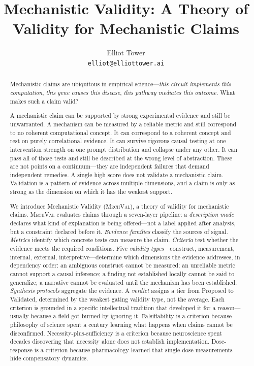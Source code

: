 \documentclass{article}
\title{Mechanistic Validity: A Theory of Validity for Mechanistic Claims}
\author{
Elliot Tower \\
\texttt{elliot@elliottower.ai}
}
\newcommand{\mechval}{\textsc{MechVal}}
\begin{document}
\maketitle

\begin{abstract}
Mechanistic claims are ubiquitous in empirical science---\emph{this circuit implements this computation}, \emph{this gene causes this disease}, \emph{this pathway mediates this outcome}. What makes such a claim valid?

A mechanistic claim can be supported by strong experimental evidence and still be unwarranted. A mechanism can be measured by a reliable metric and still correspond to no coherent computational concept. It can correspond to a coherent concept and rest on purely correlational evidence. It can survive rigorous causal testing at one intervention strength on one prompt distribution and collapse under any other. It can pass all of those tests and still be described at the wrong level of abstraction. These are not points on a continuum---they are independent failures that demand independent remedies. A single high score does not validate a mechanistic claim. Validation is a pattern of evidence across multiple dimensions, and a claim is only as strong as the dimension on which it has the weakest support.

We introduce Mechanistic Validity (\mechval{}), a theory of validity for mechanistic claims. \mechval{} evaluates claims through a seven-layer pipeline: a \emph{description mode} declares what kind of explanation is being offered---not a label applied after analysis, but a constraint declared before it. \emph{Evidence families} classify the sources of signal. \emph{Metrics} identify which concrete tests can measure the claim. \emph{Criteria} test whether the evidence meets the required conditions. Five \emph{validity types}---construct, measurement, internal, external, interpretive---determine which dimensions the evidence addresses, in dependency order: an ambiguous construct cannot be measured; an unreliable metric cannot support a causal inference; a finding not established locally cannot be said to generalize; a narrative cannot be evaluated until the mechanism has been established. \emph{Synthesis protocols} aggregate the evidence. A \emph{verdict} assigns a tier from Proposed to Validated, determined by the weakest gating validity type, not the average. Each criterion is grounded in a specific intellectual tradition that developed it for a reason---usually because a field got burned by ignoring it. Falsifiability is a criterion because philosophy of science spent a century learning what happens when claims cannot be disconfirmed. Necessity-plus-sufficiency is a criterion because neuroscience spent decades discovering that necessity alone does not establish implementation. Dose-response is a criterion because pharmacology learned that single-dose measurements hide compensatory dynamics.


\end{abstract}
\end{document}
